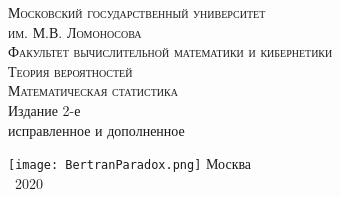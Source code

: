 \begin{titlepage}
    \centering
    \vfill
    {\scshape\large
        Московский государственный университет\\
        им. М.В. Ломоносова\\
        Факультет вычислительной математики и кибернетики\\
   }
    \vskip1cm
    {\scshape\huge
        Теория вероятностей\\
        Математическая статистика\\
   }
    \vskip1cm
   {\large
        Издание 2-е\\
        исправленное и дополненное\\
   }

    \vfill
    \texttt{[image: BertranParadox.png]}
    \vfill
    {\upshape\large
        Москва\\
        ~2020
   }
\end{titlepage}
